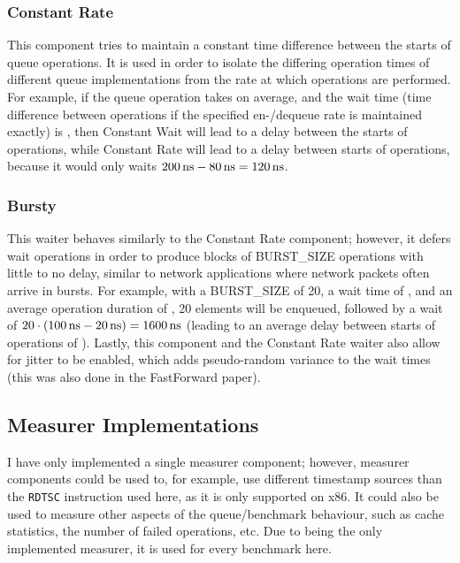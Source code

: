 \subsubsection*{Constant Rate}
This component tries to maintain a constant time difference between the starts of queue operations.
It is used in order to isolate the differing operation times of different queue implementations from the rate
at which operations are performed.
For example, if the queue operation takes  on average, and the wait time (time difference between
operations if the specified en-/dequeue rate is maintained exactly) is , then Constant Wait will lead
to a  delay between the starts of operations, while Constant Rate will lead to a  delay
between starts of operations, because it would only waits $\SI{200}{\nano\second}-\SI{80}{\nano\second}=\SI{120}{\nano\second}$.

\subsubsection*{Bursty}
This waiter behaves similarly to the Constant Rate component; however, it defers wait operations in order to
produce blocks of BURST\_SIZE operations with little to no delay, similar to network applications where
network packets often arrive in bursts.
For example, with a BURST\_SIZE of 20, a wait time of , and an average operation duration of ,
20 elements will be enqueued, followed by a wait of $20\cdot(\SI{100}{\nano\second} - \SI{20}{\nano\second}) = \SI{1600}{\nano\second}$ (leading to an average
delay between starts of operations of ).
Lastly, this component and the Constant Rate waiter also allow for jitter to be enabled, which adds pseudo-random
variance to the wait times (this was also done in the FastForward paper\cite{FastForward}).

\subsection{Measurer Implementations}
I have only implemented a single measurer component; however, measurer components could be used to, for
example, use different timestamp sources than the \texttt{RDTSC} instruction used here, as it is only supported on x86.
It could also be used to measure other aspects of the queue/benchmark behaviour, such as cache statistics, the
number of failed operations, etc.
Due to being the only implemented measurer, it is used for every benchmark here.
